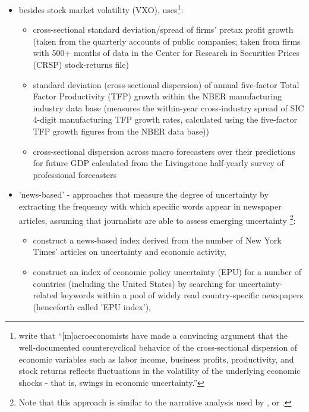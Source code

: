\documentclass[a4paper,11pt,listof=nochaptergap,oneside,pointednumbers,bibtotoc,bigheadings,liststotoc]{scrbook}
\theoremstyle{mysatz}
\theoremstyle{mydefinition}
\theoremstyle{mytheorem}
\theoremstyle{mybemerkung}
\begin{document}
\begin{itemize}
\begin{itemize}
\begin{itemize}
			\end{itemize}
			\item besides stock market volatility (VXO), \citet{bloom:09} uses\footnote{\citet[p. 1]{gilchristetal:14} write that ``[m]acroeconomists have made a convincing argument that the well-documented countercyclical behavior of the cross-sectional dispersion of economic variables such as labor income, business profits, productivity, and stock returns reflects fluctuations in the volatility of the underlying economic shocks - that is, swings in economic uncertainty.''}: 
			\begin{itemize}
				\item cross-sectional standard deviation/spread of firms' pretax profit growth (taken from the quarterly accounts of public companies; taken from firms with 500+ months of data in the Center for Research in Securities Prices (CRSP) stock-returns file)
				\item standard deviation (cross-sectional dispersion) of annual five-factor Total Factor Productivity (TFP) growth within the NBER manufacturing industry data base (measures the within-year cross-industry spread of SIC 4-digit manufacturing TFP growth rates, calculated using the five-factor TFP growth figures from the NBER data base))
				\item cross-sectional dispersion across macro forecasters over their predictions for future GDP calculated from the Livingstone half-yearly survey of professional forecasters
			\end{itemize}
			\item 'news-based' - approaches that measure the degree of uncertainty by extracting the frequency with which specific words appear in newspaper articles, assuming that journalists are able to assess emerging uncertainty \footnote{Note that this approach is similar to the narrative analysis used by \citet{romerandromer:04}, \citet{romandrom:17} or \citet{ramey:09}.}: 
			\begin{itemize}
				\item \citet{alexopoulosandcohen:09} construct a news-based index derived from the number of New York Times' articles on uncertainty and economic activity,
				\item \citet{bakeretal:15} construct an index of economic policy uncertainty (EPU) for a number of countries (including the United States) by searching for uncertainty-related keywords within a pool of widely read country-specific newspapers (henceforth called 'EPU index'),\\

\end{itemize}
\end{itemize}
\end{itemize}
\end{document}
